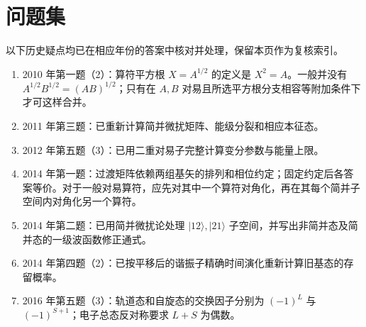 \chapter*{问题集}
以下历史疑点均已在相应年份的答案中核对并处理，保留本页作为复核索引。
\begin{enumerate}
	\renewcommand{\labelenumi}{\arabic{enumi}.}
	\item
	2010 年第一题（2）：算符平方根 $X=A^{1/2}$ 的定义是 $X^2=A$。一般并没有
	$A^{1/2}B^{1/2}=(AB)^{1/2}$；只有在 $A,B$ 对易且所选平方根分支相容等附加条件下才可这样合并。
	\item
	2011 年第三题：已重新计算简并微扰矩阵、能级分裂和相应本征态。
	\item
	2012 年第五题（3）：已用二重对易子完整计算变分参数与能量上限。
	\item
	2014 年第一题：过渡矩阵依赖两组基矢的排列和相位约定；固定约定后各答案等价。对于一般对易算符，应先对其中一个算符对角化，再在其每个简并子空间内对角化另一个算符。
	\item
	2014 年第二题：已用简并微扰论处理 $|12\rangle,|21\rangle$ 子空间，并写出非简并态及简并态的一级波函数修正通式。
	\item
	2014 年第四题（2）：已按平移后的谐振子精确时间演化重新计算旧基态的存留概率。
	\item
	2016 年第五题（3）：轨道态和自旋态的交换因子分别为 $(-1)^L$ 与 $(-1)^{S+1}$；电子总态反对称要求 $L+S$ 为偶数。
\end{enumerate}
